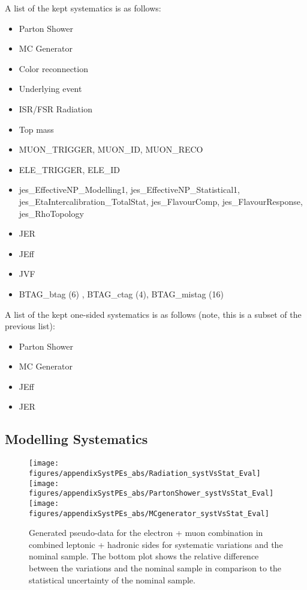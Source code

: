 A list of the kept systematics is as follows:
\begin{itemize}
\item Parton Shower
\item MC Generator
\item Color reconnection
\item Underlying event
\item ISR/FSR \ttbar Radiation
\item Top mass
\item MUON\_TRIGGER, MUON\_ID, MUON\_RECO
\item ELE\_TRIGGER, ELE\_ID
\item jes\_EffectiveNP\_Modelling1, jes\_EffectiveNP\_Statistical1, jes\_EtaIntercalibration\_TotalStat, jes\_FlavourComp, jes\_FlavourResponse, jes\_RhoTopology
\item JER
\item JEff
\item JVF
\item BTAG\_btag (6) , BTAG\_ctag (4), BTAG\_mistag (16)

\end{itemize}

A list of the kept one-sided systematics is as follows (note, this is a subset of the previous list):
\begin{itemize}
\item Parton Shower
\item MC Generator
\item JEff
\item JER
\end{itemize}

\clearpage
\subsection{Modelling Systematics}

\begin{figure}[!hb]
\begin{center}
        \texttt{[image: figures/appendixSystPEs\_abs/Radiation\_systVsStat\_Eval]}\\
        \texttt{[image: figures/appendixSystPEs\_abs/PartonShower\_systVsStat\_Eval]}\\
        \texttt{[image: figures/appendixSystPEs\_abs/MCgenerator\_systVsStat\_Eval]}
\caption{Generated pseudo-data for the electron + muon combination in combined leptonic + hadronic sides for systematic variations and the nominal \ttbar sample. The bottom plot shows the relative difference between the variations and the nominal sample in comparison to the statistical uncertainty of the nominal sample.}   
\label{fig:systematicVar_lephad_modelling_1}
\end{center}
\end{figure}

